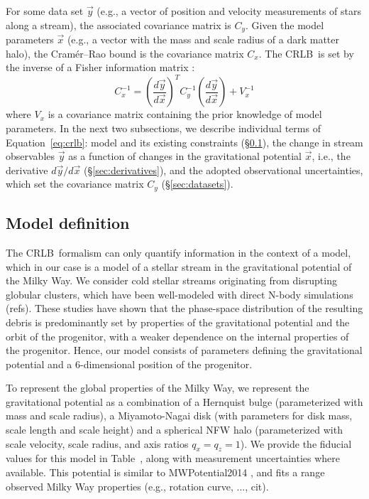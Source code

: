 \documentclass[modern]{aastex61}
\newcommand{\acronym}[1]{{\small{#1}}}
\newcommand{\CRLB}{\acronym{CRLB}}
\begin{document}
For some data set $\vec{y}$ (e.g., a vector of position and velocity measurements of stars along a stream), the associated covariance matrix is $C_y$.
Given the model parameters $\vec{x}$ (e.g., a vector with the mass and scale radius of a dark matter halo), the Cram\' er--Rao bound is the covariance matrix $C_x$.
The \CRLB\ is set by the inverse of a Fisher information matrix \citep{}:
\begin{equation}
C_x^{-1} = \left(\frac{d\vec{y}}{d\vec{x}}\right)^{T} C_y^{-1} \left(\frac{d\vec{y}}{d\vec{x}}\right) + V_x^{-1}
\label{eq:crlb}
\end{equation}
where $V_x$ is a covariance matrix containing the prior knowledge of model parameters.
In the next two subsections, we describe individual terms of Equation~\ref{eq:crlb}: model and its existing constraints (\S\ref{sec:model}), the change in stream observables $\vec{y}$ as a function of changes in the gravitational potential $\vec{x}$, i.e., the derivative $d\vec{y}/d\vec{x}$ (\S\ref{sec:derivatives}), and the adopted observational uncertainties, which set the covariance matrix $C_y$ (\S\ref{sec:datasets}).

\subsection{Model definition}
\label{sec:model}
The \CRLB\ formalism can only quantify information in the context of a model, which in our case is a model of a stellar stream in the gravitational potential of the Milky Way.
We consider cold stellar streams originating from disrupting globular clusters, which have been well-modeled with direct N-body simulations (refs).
These studies have shown that the phase-space distribution of the resulting debris is predominantly set by properties of the gravitational potential and the orbit of the progenitor, with a weaker dependence on the internal properties of the progenitor.
Hence, our model consists of parameters defining the gravitational potential and a 6-dimensional position of the progenitor.

To represent the global properties of the Milky Way, we represent the gravitational potential as a combination of a Hernquist bulge (parameterized with mass and scale radius), a Miyamoto-Nagai disk (with parameters for disk mass, scale length and scale height) and a spherical NFW halo (parameterized with scale velocity, scale radius, and axis ratios $q_x=q_z=1$).
We provide the fiducial values for this model in Table~, along with measurement uncertainties where available.
This potential is similar to MWPotential2014 \citep{galpy}, and fits a range observed Milky Way properties (e.g., rotation curve, ..., cit).
\end{document}
